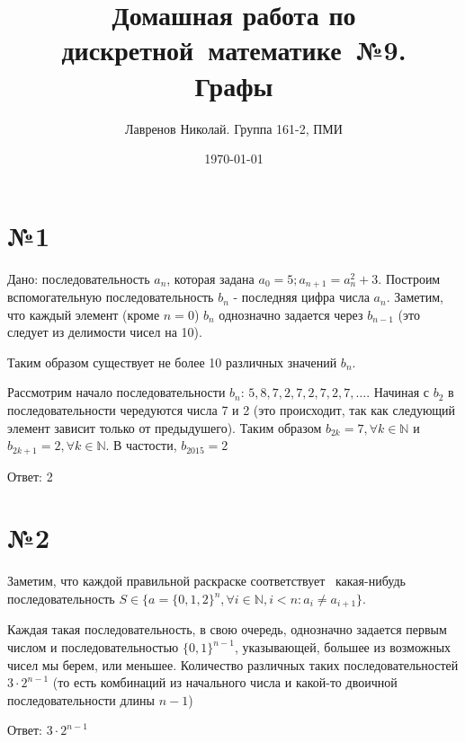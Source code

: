\documentclass[12pt]{article}
\title{Домашная работа по дискретной~математике~№9.\\Графы}
\date{\today}
\author{Лавренов Николай. Группа 161-2, ПМИ}
\begin{document}
	\section*{№1}
	Дано: последовательность $a_n$, которая задана $a_0 = 5; a_{n+1}=a_n^2+3$.
	Построим вспомогательную последовательность $b_n$ - последняя цифра числа $a_n$.
	Заметим, что каждый элемент (кроме $n = 0$) $b_n$ однозначно задается 
	через $b_{n-1}$ (это следует из делимости чисел на 10).
	
	Таким образом существует не более 10 различных значений $b_n$. 
	
	Рассмотрим начало последовательности $b_n$: \;
	$5, 8, 7, 2, 7, 2, 7, 2, 7, \dots$. Начиная с $b_2$ в последовательности чередуются числа 7 и 2 (это происходит, так как следующий элемент зависит только от предыдушего). 
	Таким образом $b_{2k} = 7, \forall k \in \mathbb{N}$ и
	$b_{2k+1} = 2, \forall k \in \mathbb{N}$.
	В частости, $b_{2015}=2$ %
	
	Ответ: 2
	
	\section*{№2}
	
	Заметим, что каждой правильной раскраске соответствует \
	какая-нибудь последовательность $S \in \{a=\{0, 1, 2\}^n, \forall i \in \mathbb{N}, i < n : a_i \neq a_{i+1}\}$.
	
	Каждая такая последовательность, в свою очередь, однозначно задается 
	первым числом и последовательностью $\{0, 1\}^{n-1}$, указывающей,
	большее из возможных чисел мы берем, или меньшее. 
	Количество различных таких последовательностей	
	$3 \cdot 2^{n-1}$
	(то есть комбинаций из начального числа и какой-то двоичной последовательности длины $n - 1$)
	
	Ответ: $3 \cdot 2^{n-1}$


	
\end{document}

